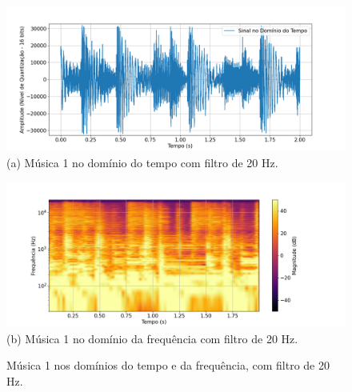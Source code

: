 \begin{figure}[htpb]
    \centering
    \begin{minipage}[b]{0.7\textwidth}
        \centering
        \includegraphics[width=\textwidth]{figuras/fig81.png}
        \vspace{0.3cm} %
        (a) Música 1 no domínio do tempo com filtro de 20 Hz.
    \end{minipage}
    \hspace{0.5cm} %

    \begin{minipage}[b]{0.75\textwidth}
        \centering
        \includegraphics[width=\textwidth]{figuras/fig82.png}
        \vspace{0.3cm} %
        (b) Música 1 no domínio da frequência com filtro de 20 Hz.
    \end{minipage}

    \caption{Música 1 nos domínios do tempo e da frequência, com filtro de 20 Hz.}
    \label{fig81}
\end{figure}

